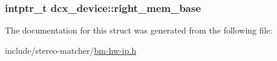 \subsubsection[{\texorpdfstring{right\+\_\+mem\+\_\+base}{right_mem_base}}]{\setlength{\rightskip}{0pt plus 5cm}intptr\+\_\+t dcx\+\_\+device\+::right\+\_\+mem\+\_\+base}\hypertarget{structdcx__device_a2878b0cea2e70a7a7d7299baa8f41d74}{}\label{structdcx__device_a2878b0cea2e70a7a7d7299baa8f41d74}


The documentation for this struct was generated from the following file\+:\begin{DoxyCompactItemize}
\item 
include/stereo-\/matcher/\hyperlink{bm-hw-ip_8h}{bm-\/hw-\/ip.\+h}\end{DoxyCompactItemize}
